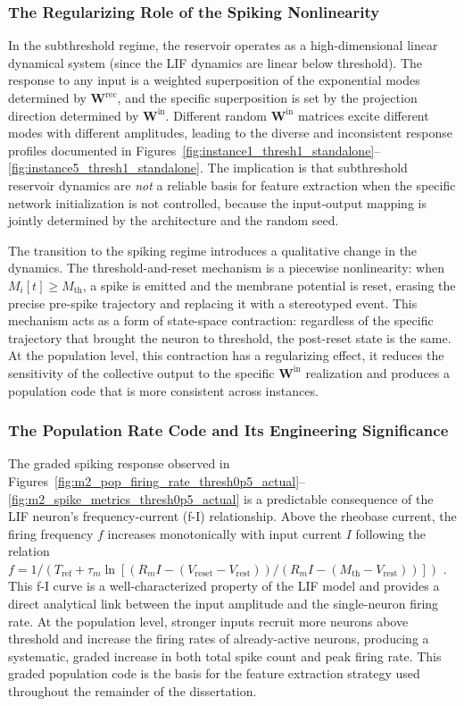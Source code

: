 \subsubsection{The Regularizing Role of the Spiking Nonlinearity}

In the subthreshold regime, the reservoir operates as a high-dimensional linear dynamical system (since the LIF dynamics are linear below threshold). The response to any input is a weighted superposition of the exponential modes determined by $\mathbf{W}^{\text{rec}}$, and the specific superposition is set by the projection direction determined by $\mathbf{W}^{\text{in}}$. Different random $\mathbf{W}^{\text{in}}$ matrices excite different modes with different amplitudes, leading to the diverse and inconsistent response profiles documented in Figures~\ref{fig:instance1_thresh1_standalone}--\ref{fig:instance5_thresh1_standalone}. The implication is that subthreshold reservoir dynamics are \emph{not} a reliable basis for feature extraction when the specific network initialization is not controlled, because the input-output mapping is jointly determined by the architecture and the random seed.

The transition to the spiking regime introduces a qualitative change in the dynamics. The threshold-and-reset mechanism is a piecewise nonlinearity: when $M_i[t] \geq M_{\text{th}}$, a spike is emitted and the membrane potential is reset, erasing the precise pre-spike trajectory and replacing it with a stereotyped event. This mechanism acts as a form of state-space contraction: regardless of the specific trajectory that brought the neuron to threshold, the post-reset state is the same. At the population level, this contraction has a regularizing effect, it reduces the sensitivity of the collective output to the specific $\mathbf{W}^{\text{in}}$ realization and produces a population code that is more consistent across instances.

\subsubsection{The Population Rate Code and Its Engineering Significance}

The graded spiking response observed in Figures~\ref{fig:m2_pop_firing_rate_thresh0p5_actual}--\ref{fig:m2_spike_metrics_thresh0p5_actual} is a predictable consequence of the LIF neuron's frequency-current (f-I) relationship. Above the rheobase current, the firing frequency $f$ increases monotonically with input current $I$ following the relation $f = 1/(T_{\text{ref}} + \tau_m \ln[(R_m I - (V_{\text{reset}} - V_{\text{rest}}))/(R_m I - (M_{\text{th}} - V_{\text{rest}}))])$ \cite{gerstner_spiking_2002, dayan2001}. This f-I curve is a well-characterized property of the LIF model and provides a direct analytical link between the input amplitude and the single-neuron firing rate. At the population level, stronger inputs recruit more neurons above threshold and increase the firing rates of already-active neurons, producing a systematic, graded increase in both total spike count and peak firing rate. This graded population code is the basis for the feature extraction strategy used throughout the remainder of the dissertation.

